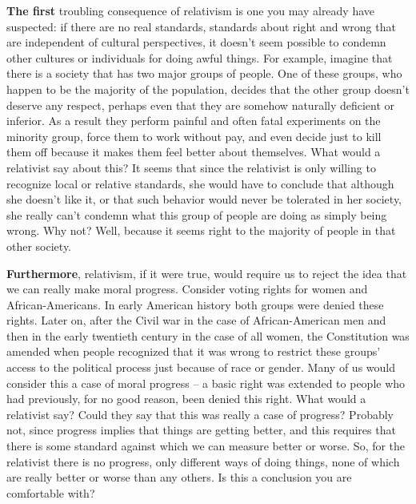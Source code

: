 \documentclass[]{book}
\begin{document}
\textbf{The first} troubling consequence of relativism is one you may already have suspected: if there are no real standards, standards about right and wrong that are independent of cultural perspectives, it doesn't seem possible to condemn other cultures or individuals for doing awful things. For example, imagine that there is a society that has two major groups of people. One of these groups, who happen to be the majority of the population, decides that the other group doesn't deserve any respect, perhaps even that they are somehow naturally deficient or inferior. As a result they perform painful and often fatal experiments on the minority group, force them to work without pay, and even decide just to kill them off because it makes them feel better about themselves. What would a relativist say about this? It seems that since the relativist is only willing to recognize local or relative standards, she would have to conclude that although she doesn't like it, or that such behavior would never be tolerated in her society, she really can't condemn what this group of people are doing as simply being wrong. Why not? Well, because it seems right to the majority of people in that other society.

\textbf{Furthermore}, relativism, if it were true, would require us to reject the idea that we can really make moral progress. Consider voting rights for women and African-Americans. In early American history both groups were denied these rights. Later on, after the Civil war in the case of African-American men and then in the early twentieth century in the case of all women, the Constitution was amended when people recognized that it was wrong to restrict these groups' access to the political process just because of race or gender. Many of us would consider this a case of moral progress -- a basic right was extended to people who had previously, for no good reason, been denied this right. What would a relativist say? Could they say that this was really a case of progress? Probably not, since progress implies that things are getting better, and this requires that there is some standard against which we can measure better or worse. So, for the relativist there is no progress, only different ways of doing things, none of which are really better or worse than any others. Is this a conclusion you are comfortable with?
\end{document}
